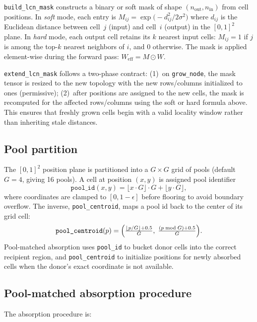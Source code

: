 \documentclass[11pt]{article}
\begin{document}
\texttt{build\_lcn\_mask} constructs a binary or soft mask of shape
$(n_{\text{out}}, n_{\text{in}})$ from cell positions.
In \emph{soft} mode, each entry is
$M_{ij} = \exp\!\bigl(-d_{ij}^2 / 2\sigma^2\bigr)$
where $d_{ij}$ is the Euclidean distance between cell~$j$ (input) and
cell~$i$ (output) in the $[0,1]^2$ plane.
In \emph{hard} mode, each output cell retains its $k$ nearest input
cells: $M_{ij} = 1$ if $j$ is among the top-$k$ nearest neighbors of
$i$, and $0$ otherwise.
The mask is applied element-wise during the forward pass:
$W_{\text{eff}} = M \odot W$.

\texttt{extend\_lcn\_mask} follows a two-phase contract: (1)~on
\texttt{grow\_node}, the mask tensor is resized to the new topology
with the new rows/columns initialized to ones (permissive); (2)~after
positions are assigned to the new cells, the mask is recomputed for the
affected rows/columns using the soft or hard formula above.
This ensures that freshly grown cells begin with a valid locality
window rather than inheriting stale distances.

\subsection{Pool partition}
\label{sec:detail-pool}

The $[0,1]^2$ position plane is partitioned into a $G \times G$ grid of
pools (default $G{=}4$, giving 16 pools).
A cell at position $(x, y)$ is assigned pool identifier
\[
  \texttt{pool\_id}(x,y) = \lfloor x \cdot G \rfloor \cdot G
                          + \lfloor y \cdot G \rfloor,
\]
where coordinates are clamped to $[0, 1{-}\epsilon]$ before flooring to
avoid boundary overflow.
The inverse, \texttt{pool\_centroid}, maps a pool id back to the center
of its grid cell:
\[
  \texttt{pool\_centroid}(p) = \Bigl(
    \tfrac{\lfloor p / G \rfloor + 0.5}{G},\;
    \tfrac{(p \bmod G) + 0.5}{G}
  \Bigr).
\]
Pool-matched absorption uses \texttt{pool\_id} to bucket donor cells
into the correct recipient region, and \texttt{pool\_centroid} to
initialize positions for newly absorbed cells when the donor's exact
coordinate is not available.

\subsection{Pool-matched absorption procedure}
\label{sec:detail-absorb}

The absorption procedure is:
\end{document}

